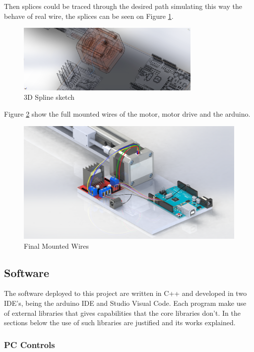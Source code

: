 \documentclass[transmag]{IEEEtran}
\begin{document}
Then splices could be traced through the desired path simulating this way the behave of real wire, the splices can be seen on Figure \ref{ASS4-Wiring}.


\begin{figure}[H]
\centerline{\includegraphics[width=3.5in]{./images/ASS4-Wiring}}
\caption{3D Spline sketch\label{ASS4-Wiring}}
\end{figure}

Figure \ref{ASS4-Wiring4} show the full mounted wires of the motor, motor drive and the arduino.

\begin{figure}[h]
\centerline{\includegraphics[width=7in]{./images/ASS4-Wiring4}}
\caption{Final Mounted Wires \label{ASS4-Wiring4}}
\end{figure}


\subsection{Software}
 
The software deployed to this project are written in C++ and developed in two IDE's, being the arduino IDE and Studio Visual Code. Each program make use of external libraries that gives capabilities that the core libraries don't. In the sections below the use of such libraries are 
justified and its works explained.

 
\subsubsection{PC Controls}
\end{document}
